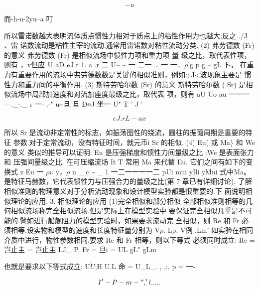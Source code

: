 \[-u\]

而-h-u-2yu--a 叮

所以雷诺数越大表明流体质点惯性力相对于质点上的粘性作用力也越大;反之 ./J 、雷 诺数流动是粘性主宰的流动.通常用雷诺数对粘性流动分类. (2) 弗劳德数 (Fr) 的意义 弗劳德数 (Fr) 是相似流场中惯性力项和重力项 量 级之比，取代表性项，则有 ，v但应 ${\rm U}$ aD ${\rm e}$J.r 1. a .r 二 U\textasciitilde{} \textasciitilde{} 一 二一 … 一 一… $\rho$'g p g -- gL 卜， 在重力有重要作用的流场中弗劳德数数是关键的相似准则，例如:;.J<波现象主要是 惯性力和重力间的平衡作用. (3) 斯特劳哈尔数 (Sr) 的意义 斯特劳哈尔数 ( Sr) 是相似流场中局部加速度和对流加座度最级之比，取代表 项，则有 aU Uo au 一一一 ---.\_-.\_ $\iota$ 一- .-" u\textasciitilde{}旦 旦 D${\rm e}$J 坐一 U" T ' J '

\[eJ.r L - ax\]

所以 Sr 是流动非定常性的标志，如振荡图性的绕流，圆柱的振蔼周期是重要的特征 参数.对于定常流动，没有特征时间，就元币i Sr 的相似. (4) Eu( 或 Ma\} 和 We 的意义 类似的推导可以证明: Eu 是压强梯度和惯性力间量级之比 ;We 是表面张力和 压强间量级之比. 在可压缩流场 It T 常用 Ma 来代替 Eu. 它们之间有如下的变换式 z Eu 一 $\rho$$\upsilon$ y，$\rho$ u \_ c \textasciitilde{} \_ 1 一二一一一一二 pUi mui yIli yMui 式中Ma。 是特征马赫数，它代表惯性力与压强合力的量级之比(第 7 章已有详细讨论). 了解相似准则的物理意义对于分析流动现象和设计模型实验都是很重要的.下 面说明相似理论的应用. 3. 相似理论的应用 (1)完全相似和部分相似 全部相似准则相等的几何相似流场称完全相似流场.但是实际上在模型实验中 要保证完全相似几乎是不可能的.譬如进行船舰阻力的模型实验时，如果要求流动完 全相似，则 Re 和 Fr 必须相等.设实物和模型的速度和长度特征量分别为 V$\rho$. Lp. V例 .Lm' 如实验在相同介质中进行，物性参数相同.要求 Re 和 Fr 相等，则以下等式 必须同时成立: Re = 岂止主 = 岂止主 I.J\_ P. Fr = 旦i = UL gL" gLm

也就是要求以下等式成立: U$\tilde{U}$;H U.L 命 = U\_L\_. , ,:, p = 一-

\[I'-P - m-", ' l.....\]

